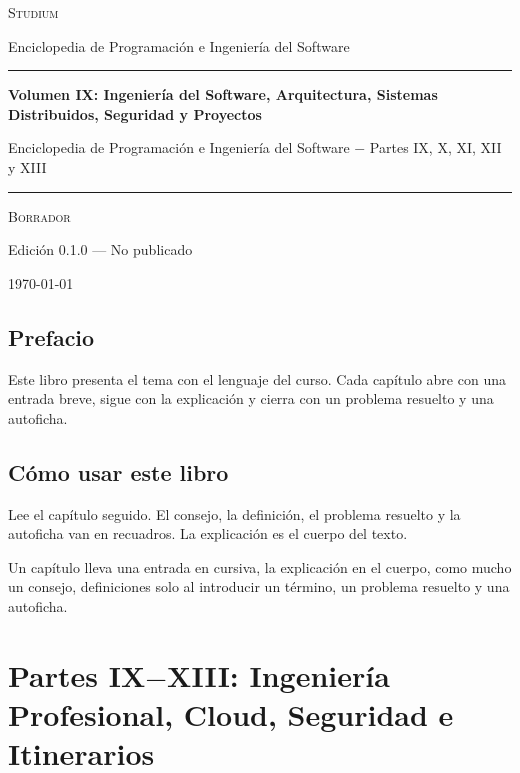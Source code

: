 \documentclass{book}
\begin{document}
\frontmatter
\thispagestyle{empty}
\setlength{\parindent}{0pt}
\vspace*{0.08\textheight}
{\normalsize\scshape\color{studiumInk} Studium\par}
{\small Enciclopedia de Programación e Ingeniería del Software\par}
\vspace{0.55em}
{\color{studiumRule}\rule{\linewidth}{0.9pt}\par}
\vspace{0.16\textheight}
{\raggedright\Huge\bfseries Volumen IX: Ingeniería del Software, Arquitectura, Sistemas Distribuidos, Seguridad y Proyectos\par}
\vspace{0.9em}
{\raggedright\Large\color{studiumInk} Enciclopedia de Programación e Ingeniería del Software \(-\) Partes IX, X, XI, XII y XIII\par}
\vfill
{\color{studiumRule}\rule{0.36\linewidth}{0.45pt}\par}
\vspace{1.05em}
{\large\scshape Borrador\par}
\vspace{0.45em}
{\normalsize Edición 0.1.0 --- No publicado\par}
\vspace{0.4em}
{\normalsize\today\par}
\vspace*{0.08\textheight}
\clearpage
\chapter{Prefacio}
\noindent Este libro presenta el tema con el lenguaje del curso. Cada capítulo abre con una entrada breve, sigue con la explicación y cierra con un problema resuelto y una autoficha.
\chapter{Cómo usar este libro}
\noindent Lee el capítulo seguido. El consejo, la definición, el problema resuelto y la autoficha van en recuadros. La explicación es el cuerpo del texto.

\noindent Un capítulo lleva una entrada en cursiva, la explicación en el cuerpo, como mucho un consejo, definiciones solo al introducir un término, un problema resuelto y una autoficha.
\tableofcontents
\mainmatter

\part{Partes IX\(-\)XIII: Ingeniería Profesional, Cloud, Seguridad e Itinerarios}
\end{document}
